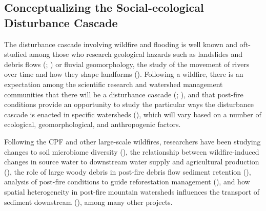\documentclass[
]{article}
\begin{document}
\subsection{Conceptualizing the Social-ecological Disturbance Cascade}\label{conceptualizing-the-social-ecological-disturbance-cascade-1}

The disturbance cascade involving wildfire and flooding is well known and oft-studied among those who research geological hazards such as landslides and debris flows (; ) or fluvial geomorphology, the study of the movement of rivers over time and how they shape landforms (). Following a wildfire, there is an expectation among the scientific research and watershed management communities that there will be a disturbance cascade (; ), and that post-fire conditions provide an opportunity to study the particular ways the disturbance cascade is enacted in specific watersheds (), which will vary based on a number of ecological, geomorphological, and anthropogenic factors.

Following the CPF and other large-scale wildfires, researchers have been studying changes to soil microbiome diversity (), the relationship between wildfire-induced changes in source water to downstream water supply and agricultural production (), the role of large woody debris in post-fire debris flow sediment retention (), analysis of post-fire conditions to guide reforestation management (), and how spatial heterogeneity in post-fire mountain watersheds influences the transport of sediment downstream (), among many other projects.
\end{document}

